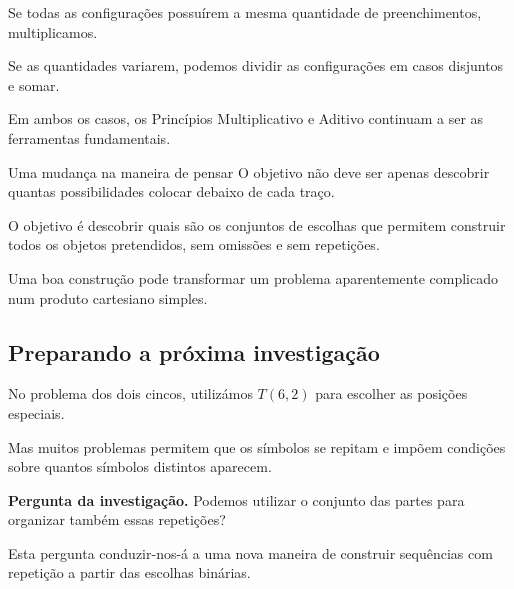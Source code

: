\documentclass[11pt,a4paper,oneside]{book}
\newcommand{\Pergunta}[1]{\begin{perguntabox}\textbf{Pergunta da investigação.} #1\end{perguntabox}}
\begin{document}
Se todas as configurações
possuírem a mesma quantidade
de preenchimentos, multiplicamos.

Se as quantidades variarem,
podemos dividir as configurações
em casos disjuntos e somar.

Em ambos os casos, os Princípios
Multiplicativo e Aditivo continuam
a ser as ferramentas fundamentais.

\begin{descobertabox}{Uma mudança na maneira de pensar}
O objetivo não deve ser apenas
descobrir quantas possibilidades
colocar debaixo de cada traço.

O objetivo é descobrir
quais são os conjuntos de escolhas
que permitem construir todos
os objetos pretendidos,
sem omissões e sem repetições.

Uma boa construção pode transformar
um problema aparentemente complicado
num produto cartesiano simples.
\end{descobertabox}

\subsection*{Preparando a próxima investigação}

No problema dos dois cincos,
utilizámos $T(6,2)$ para
escolher as posições especiais.

Mas muitos problemas permitem
que os símbolos se repitam
e impõem condições sobre
quantos símbolos distintos aparecem.

\Pergunta{Podemos utilizar
o conjunto das partes para
organizar também essas repetições?}

Esta pergunta conduzir-nos-á
a uma nova maneira de
construir sequências com repetição
a partir das escolhas binárias.
\end{document}
